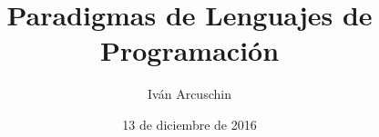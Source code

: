 \documentclass[11pt]{article}
\theoremstyle{plain}
\theoremstyle{definition}
\theoremstyle{remark}
\begin{document}
\title{Paradigmas de Lenguajes de Programación}
\author{Iván Arcuschin}
\date{13 de diciembre de 2016}
\maketitle
\tableofcontents

\newpage


\newpage


\newpage


\newpage


\newpage


\newpage
\appendix

\end{document}

